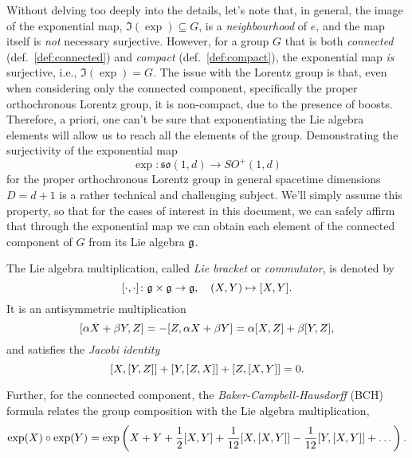 Without delving too deeply into the details, let's note that, in general, the image of the exponential map, $\Im(\exp) \subseteq G$, is a \emph{neighbourhood} of $e$, and the map itself is \emph{not} necessary surjective. However, for a group $G$ that is both \emph{connected} (def.~\ref{def:connected}) and \emph{compact} (def.~\ref{def:compact}), the exponential map \emph{is} surjective, i.e., $\Im(\exp) = G$. The issue with the Lorentz group is that, even when considering only the connected component, specifically the proper orthochronous Lorentz group, it is non-compact, due to the presence of boosts. Therefore, a priori, one can't be sure that exponentiating the Lie algebra elements will allow us to reach all the elements of the group. Demonstrating the surjectivity of the exponential map
\begin{equation}
    \exp \colon \mathfrak{so}(1,d) \to SO^+(1,d)
\end{equation}
for the proper orthochronous Lorentz group in general spacetime dimensions $D = d + 1$ is a rather technical and challenging subject. We'll simply assume this property, so that for the cases of interest in this document, we can safely affirm that through the exponential map we can obtain each element of the connected component of $G$ from its Lie algebra $\mathfrak{g}$. 

The Lie algebra multiplication, called \emph{Lie bracket} or \emph{commutator}, is denoted by
\begin{equation}
    \comm{\cdot}{\cdot} \colon \g \times \g \to \g, \quad (X,Y) \mapsto \comm{X}{Y}.
\end{equation}
It is an antisymmetric multiplication
\begin{equation}
    \comm{\alpha X + \beta Y}{Z} = -\comm{Z}{\alpha X + \beta Y} = \alpha \comm{X}{Z} + \beta \comm{Y}{Z},
\end{equation}
and satisfies the \emph{Jacobi identity}
\begin{equation}
    \comm{X}{\comm{Y}{Z}} + \comm{Y}{\comm{Z}{X}} + \comm{Z}{\comm{X}{Y}} = 0.
\end{equation}

Further, for the connected component, the \emph{Baker-Campbell-Hausdorff} (BCH) formula relates the group composition with the Lie algebra multiplication,
\begin{equation}\label{eq:BCH-formula}
    \exp(X) \circ \exp(Y) = \exp\left( X + Y + \frac{1}{2}\comm{X}{Y} + \frac{1}{12} \comm{X}{\comm{X}{Y}} - \frac{1}{12} \comm{Y}{\comm{X}{Y}} + \dots \right).
\end{equation}

